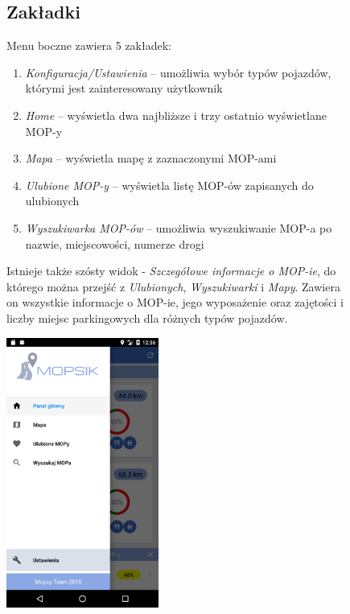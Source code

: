 \begin{figure}[!htb]
\centering
\begin{minipage}{.6\textwidth}
\subsection{Zakładki}
Menu boczne zawiera 5 zakładek: 
\begin{enumerate}
\item \textit{Konfiguracja/Ustawienia} -- umożliwia wybór typów pojazdów, którymi jest zainteresowany użytkownik
\item \textit{Home} -- wyświetla dwa najbliższe i trzy ostatnio wyświetlane MOP-y
\item \textit{Mapa} -- wyświetla mapę z zaznaczonymi MOP-ami
\item \textit{Ulubione MOP-y} -- wyświetla listę MOP-ów zapisanych do ulubionych
\item \textit{Wyszukiwarka MOP-ów} -- umożliwia wyszukiwanie MOP-a po nazwie, miejscowości, numerze drogi
\end{enumerate}
Istnieje także szósty widok - \textit{Szczegółowe informacje o MOP-ie}, do którego można przejść z \textit{Ulubionych}, \textit{Wyszukiwarki} i \textit{Mapy}. Zawiera on wszystkie informacje o MOP-ie, jego wyposażenie oraz zajętości i liczby miejsc parkingowych dla różnych typów pojazdów.
\end{minipage}%
\begin{minipage}{.4\textwidth}
  \centering
  \includegraphics[width=5cm]{images/mopsik_mobile/menu.png}
  \label{mopsik_menu}
\end{minipage}
\end{figure}


